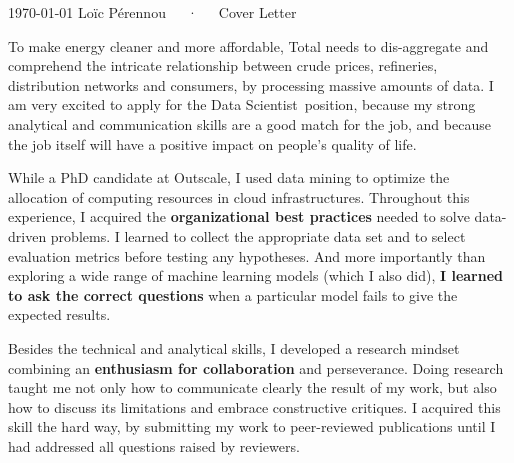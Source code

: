 \documentclass[11pt, a4paper]{awesome-cv}
\newcommand{\job}{Data Scientist}
\begin{document}
\makecvheader[R]

\makecvfooter
  {\today}
  {Loïc Pérennou~~~·~~~Cover Letter}
  {}

\makelettertitle

\begin{cvletter}
  To make energy cleaner and more affordable, Total needs to dis-aggregate and comprehend the intricate relationship between crude prices, refineries, distribution networks and consumers, by processing massive amounts of data. I am very excited to apply for the \job~position, because my strong analytical and communication skills are a good match for the job, and because the job itself will have a positive impact on people's quality of life. 

While a PhD candidate at Outscale, I used data mining to optimize the allocation of computing resources in cloud infrastructures. 
Throughout this experience, I acquired the \textbf{organizational best practices} needed to solve data-driven problems.  
I learned to collect the appropriate data set and to select evaluation metrics before testing any hypotheses. 
And more importantly than exploring a wide range of machine learning models (which I also did), \textbf{I learned to ask the correct questions} when a particular model fails to give the expected results.  

Besides the technical and analytical skills, I developed a research mindset combining an \textbf{enthusiasm for collaboration} and perseverance.  
Doing research taught me not only how to communicate clearly the result of my work, but also how to discuss its limitations and embrace constructive critiques.  
I acquired this skill the hard way, by submitting my work to peer-reviewed publications until I had addressed all questions raised by reviewers. 



\end{cvletter}
\end{document}
